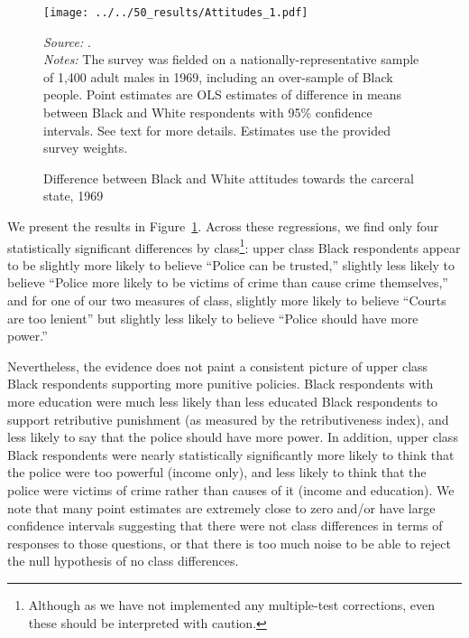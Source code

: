 \documentclass[12pt]{article}
\begin{document}
\begin{figure}[h!]
 \begin{center}
 \caption{Difference between Black and White attitudes towards the carceral state, 1969}
 \small
		 \texttt{[image: ../../50\_results/Attitudes\_1.pdf]}
 \label{figure_attitudes_class}
 	\end{center}
 	{\scriptsize{\emph{Source:} \cite{Violence1969}. }} \\
	{\scriptsize{\emph{Notes:} The survey was fielded on a nationally-representative sample of 1,400 adult males in 1969, including an over-sample of Black people.  Point estimates are OLS estimates of difference in means between Black and White respondents with 95\% confidence intervals.  See text for more details. Estimates use the provided survey weights. \singlespacing }}
\end{figure} \normalsize


We present the results in Figure~\ref{figure_attitudes_class}. Across these regressions, we find only four statistically significant differences by class\footnote{Although as we have not implemented any multiple-test corrections, even these should be interpreted with caution.}: upper class Black respondents appear to be slightly more likely to believe ``Police can be trusted,'' slightly less likely to believe ``Police more likely to be victims of crime than cause crime themselves,'' and for one of our two measures of class, slightly more likely to believe ``Courts are too lenient'' but slightly less likely to believe ``Police should have more power.''

Nevertheless, the evidence does not paint a consistent picture of upper class Black respondents supporting more punitive policies. Black respondents with more education were much less likely than less educated Black respondents to support retributive punishment (as measured by the retributiveness index), and less likely to say that the police should have more power.  In addition, upper class Black respondents were nearly statistically significantly more likely to think that the police were too powerful (income only), and less likely to think that the police were victims of crime rather than causes of it (income and education).  We note that many point estimates are extremely close to zero and/or have large confidence intervals suggesting that there were not class differences in terms of responses to those questions, or that there is too much noise to be able to reject the null hypothesis of no class differences.
\end{document}
